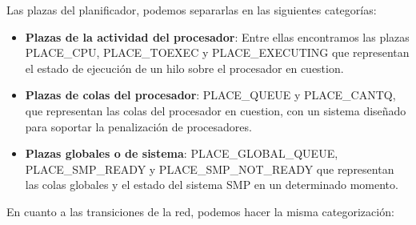 Las plazas del planificador, podemos separarlas en las siguientes categorías:

\begin{itemize}
    \item \textbf{Plazas de la actividad del procesador}: Entre ellas encontramos las plazas PLACE\_CPU, PLACE\_TOEXEC y PLACE\_EXECUTING que representan el estado de ejecución de un hilo sobre el procesador en cuestion.
    \item \textbf{Plazas de colas del procesador}: PLACE\_QUEUE y PLACE\_CANTQ, que representan las colas del procesador en cuestion, con un sistema diseñado para soportar la penalización de procesadores.
    \item \textbf{Plazas globales o de sistema}: PLACE\_GLOBAL\_QUEUE, PLACE\_SMP\_READY y PLACE\_SMP\_NOT\_READY que representan las colas globales y el estado del sistema SMP en un determinado momento.
\end{itemize}

En cuanto a las transiciones de la red, podemos hacer la misma categorización:

